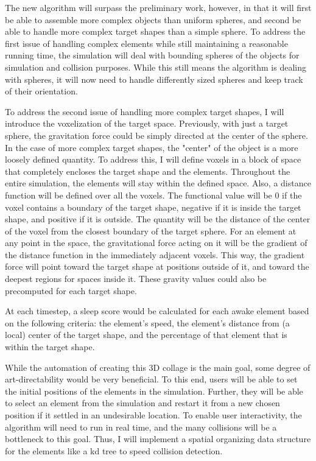 \documentclass{article}
\begin{document}
	The new algorithm will surpass the preliminary work, however, in that it will first be able to assemble more complex objects than uniform spheres, and second be able to handle more complex target shapes than a simple sphere.  To address the first issue of handling complex elements while still maintaining a reasonable running time, the simulation will deal with bounding spheres of the objects for simulation and collision purposes.  While this still means the algorithm is dealing with spheres, it will now need to handle differently sized spheres and keep track of their orientation.

	To address the second issue of handling more complex target shapes, I will introduce the voxelization of the target space.  Previously, with just a target sphere, the gravitation force could be simply directed at the center of the sphere.  In the case of more complex target shapes, the "center" of the object is a more loosely defined quantity.  To address this, I will define voxels in a block of space that completely encloses the target shape and the elements.  Throughout the entire simulation, the elements will stay within the defined space.  Also, a distance function will be defined over all the voxels.  The functional value will be 0 if the voxel contains a boundary of the target shape, negative if it is inside the target shape, and positive if it is outside.  The quantity will be the distance of the center of the voxel from the closest boundary of the target sphere.  For an element at any point in the space, the gravitational force acting on it will be the gradient of the distance function in the immediately adjacent voxels.  This way, the gradient force will point toward the target shape at positions outside of it, and toward the deepest regions for spaces inside it.  These gravity values could also be precomputed for each target shape.

	At each timestep, a sleep score would be calculated for each awake element based on the following criteria: the element's speed, the element's distance from (a local) center of the target shape, and the percentage of that element that is within the target shape.

	While the automation of creating this 3D collage is the main goal, some degree of art-directability would be very beneficial.  To this end, users will be able to set the initial positions of the elements in the simulation.  Further, they will be able to select an element from the simulation and restart it from a new chosen position if it settled in an undesirable location.  To enable user interactivity, the algorithm will need to run in real time, and the many collisions will be a bottleneck to this goal.  Thus, I will implement a spatial organizing data structure for the elements like a kd tree to speed collision detection.
\end{document}
